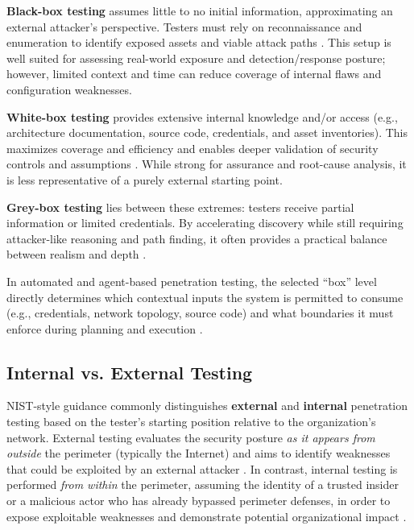 \textbf{Black-box testing} assumes little to no initial information, approximating an external attacker’s perspective. Testers must rely on reconnaissance and enumeration to identify exposed assets and viable attack paths \cite{owaspWSTGv41,nistSP800115}. This setup is well suited for assessing real-world exposure and detection/response posture; however, limited context and time can reduce coverage of internal flaws and configuration weaknesses.

\textbf{White-box testing} provides extensive internal knowledge and/or access (e.g., architecture documentation, source code, credentials, and asset inventories). This maximizes coverage and efficiency and enables deeper validation of security controls and assumptions \cite{nistSP80053,crestPenTestGuide}. While strong for assurance and root-cause analysis, it is less representative of a purely external starting point.

\textbf{Grey-box testing} lies between these extremes: testers receive partial information or limited credentials. By accelerating discovery while still requiring attacker-like reasoning and path finding, it often provides a practical balance between realism and depth \cite{nistSP80053,crestPenTestGuide}.

In automated and agent-based penetration testing, the selected ``box'' level directly determines which contextual inputs the system is permitted to consume (e.g., credentials, network topology, source code) and what boundaries it must enforce during planning and execution \cite{checkmate}. %

\subsection{Internal vs. External Testing}
\label{subsubsec:ch1-internal-external}

NIST-style guidance commonly distinguishes \textbf{external} and \textbf{internal} penetration testing based on the tester’s starting position relative to the organization’s network. External testing evaluates the security posture \emph{as it appears from outside} the perimeter (typically the Internet) and aims to identify weaknesses that could be exploited by an external attacker \cite{nistSP800115,gsaPentestGuide2024}. In contrast, internal testing is performed \emph{from within} the perimeter, assuming the identity of a trusted insider or a malicious actor who has already bypassed perimeter defenses, in order to expose exploitable weaknesses and demonstrate potential organizational impact \cite{nistSP800115,gsaPentestGuide2024}.

